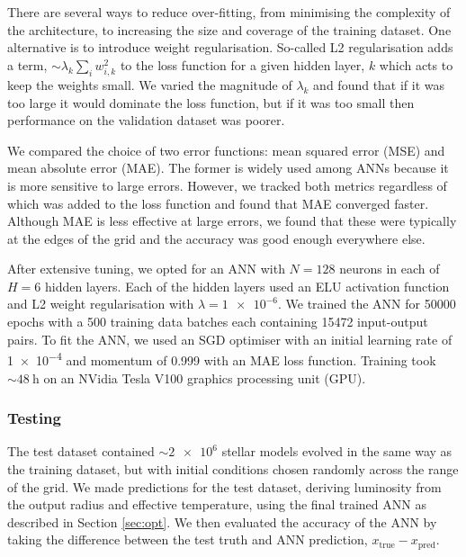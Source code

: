 \documentclass[fleqn,usenatbib]{mnras}
\begin{document}
There are several ways to reduce over-fitting, from minimising the complexity of the architecture, to increasing the size and coverage of the training dataset. One alternative is to introduce weight regularisation. So-called L2 regularisation adds a term, $\sim \lambda_k \sum_i w_{i, k}^2$ to the loss function for a given hidden layer, $k$ which acts to keep the weights small. We varied the magnitude of $\lambda_k$ and found that if it was too large it would dominate the loss function, but if it was too small then performance on the validation dataset was poorer.

We compared the choice of two error functions: mean squared error (MSE) and mean absolute error (MAE). The former is widely used among ANNs because it is more sensitive to large errors. However, we tracked both metrics regardless of which was added to the loss function and found that MAE converged faster. Although MAE is less effective at large errors, we found that these were typically at the edges of the grid and the accuracy was good enough everywhere else.

After extensive tuning, we opted for an ANN with $N=128$ neurons in each of $H=6$ hidden layers. Each of the hidden layers used an ELU activation function and L2 weight regularisation with $\lambda = \num{1e-6}$. We trained the ANN for \num{50000} epochs with a \num{500} training data batches each containing \num{15472} input-output pairs. To fit the ANN, we used an SGD optimiser with an initial learning rate of \num{1e-4} and momentum of \num{0.999} with an MAE loss function. Training took $\sim \SI{48}{\hour}$ on an NVidia Tesla V100 graphics processing unit (GPU).

\subsubsection{Testing}\label{sec:test}



The test dataset contained $\sim \num{2e6}$ stellar models evolved in the same way as the training dataset, but with initial conditions chosen randomly across the range of the grid. We made predictions for the test dataset, deriving luminosity from the output radius and effective temperature, using the final trained ANN as described in Section \ref{sec:opt}. We then evaluated the accuracy of the ANN by taking the difference between the test truth and ANN prediction, $x_\mathrm{true} - x_\mathrm{pred}$. 
\end{document}
